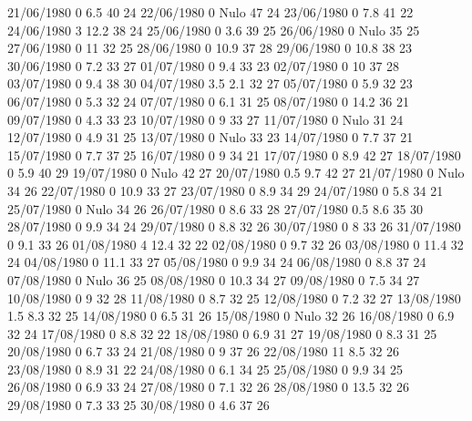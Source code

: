 21/06/1980  0      6.5    40     24 
22/06/1980  0     Nulo    47     24 
23/06/1980  0      7.8    41     22 
24/06/1980  3      12.2   38     24 
25/06/1980  0      3.6    39     25 
26/06/1980  0     Nulo    35     25 
27/06/1980  0      11     32     25 
28/06/1980  0      10.9   37     28 
29/06/1980  0      10.8   38     23 
30/06/1980  0      7.2    33     27 
01/07/1980  0      9.4    33     23 
02/07/1980  0      10     37     28 
03/07/1980  0      9.4    38     30 
04/07/1980  3.5    2.1    32     27 
05/07/1980  0      5.9    32     23 
06/07/1980  0      5.3    32     24 
07/07/1980  0      6.1    31     25 
08/07/1980  0      14.2   36     21 
09/07/1980  0      4.3    33     23 
10/07/1980  0      9      33     27 
11/07/1980  0     Nulo    31     24 
12/07/1980  0      4.9    31     25 
13/07/1980  0     Nulo    33     23 
14/07/1980  0      7.7    37     21 
15/07/1980  0      7.7    37     25 
16/07/1980  0      9      34     21 
17/07/1980  0      8.9    42     27 
18/07/1980  0      5.9    40     29 
19/07/1980  0     Nulo    42     27 
20/07/1980  0.5    9.7    42     27 
21/07/1980  0     Nulo    34     26 
22/07/1980  0      10.9   33     27 
23/07/1980  0      8.9    34     29 
24/07/1980  0      5.8    34     21 
25/07/1980  0     Nulo    34     26 
26/07/1980  0      8.6    33     28 
27/07/1980  0.5    8.6    35     30 
28/07/1980  0      9.9    34     24 
29/07/1980  0      8.8    32     26 
30/07/1980  0      8      33     26 
31/07/1980  0      9.1    33     26 
01/08/1980  4      12.4   32     22 
02/08/1980  0      9.7    32     26 
03/08/1980  0      11.4   32     24 
04/08/1980  0      11.1   33     27 
05/08/1980  0      9.9    34     24 
06/08/1980  0      8.8    37     24 
07/08/1980  0     Nulo    36     25 
08/08/1980  0      10.3   34     27 
09/08/1980  0      7.5    34     27 
10/08/1980  0      9      32     28 
11/08/1980  0      8.7    32     25 
12/08/1980  0      7.2    32     27 
13/08/1980  1.5    8.3    32     25 
14/08/1980  0      6.5    31     26 
15/08/1980  0     Nulo    32     26 
16/08/1980  0      6.9    32     24 
17/08/1980  0      8.8    32     22 
18/08/1980  0      6.9    31     27 
19/08/1980  0      8.3    31     25 
20/08/1980  0      6.7    33     24 
21/08/1980  0      9      37     26 
22/08/1980  11     8.5    32     26 
23/08/1980  0      8.9    31     22 
24/08/1980  0      6.1    34     25 
25/08/1980  0      9.9    34     25 
26/08/1980  0      6.9    33     24 
27/08/1980  0      7.1    32     26 
28/08/1980  0      13.5   32     26 
29/08/1980  0      7.3    33     25 
30/08/1980  0      4.6    37     26 
